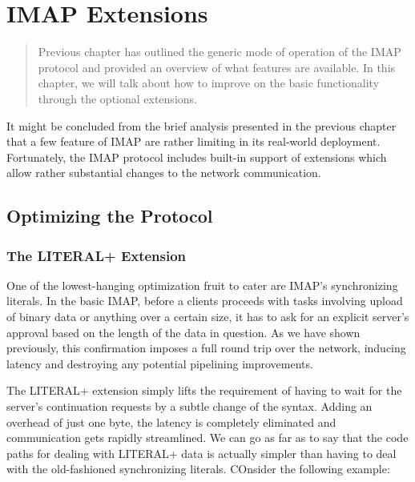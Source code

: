 \documentclass[trojita]{subfiles}
\begin{document}
\chapter{IMAP Extensions}
\label{sec:imap-extensions}

\begin{abstract}
  Previous chapter has outlined the generic mode of operation of the IMAP protocol and provided an overview of what
  features are available.  In this chapter, we will talk about how to improve on the basic functionality through the
  optional extensions.
\end{abstract}

It might be concluded from the brief analysis presented in the previous chapter that a few feature of IMAP are rather
limiting in its real-world deployment.  Fortunately, the IMAP protocol includes built-in support of extensions which
allow rather substantial changes to the network communication.

\section{Optimizing the Protocol}

\subsection{The LITERAL+ Extension}

One of the lowest-hanging optimization fruit to cater are IMAP's synchronizing literals.  In the basic IMAP, before a
clients proceeds with tasks involving upload of binary data or anything over a certain size, it has to ask for an
explicit server's approval based on the length of the data in question.  As we have shown previously, this confirmation
imposes a full round trip over the network, inducing latency and destroying any potential pipelining improvements.

The LITERAL+ extension simply lifts the requirement of having to wait for the server's continuation requests by a subtle
change of the syntax.  Adding an overhead of just one byte, the latency is completely eliminated and communication gets
rapidly streamlined.  We can go as far as to say that the code paths for dealing with LITERAL+ data is actually simpler
than having to deal with the old-fashioned synchronizing literals.  COnsider the following example:
\end{document}
